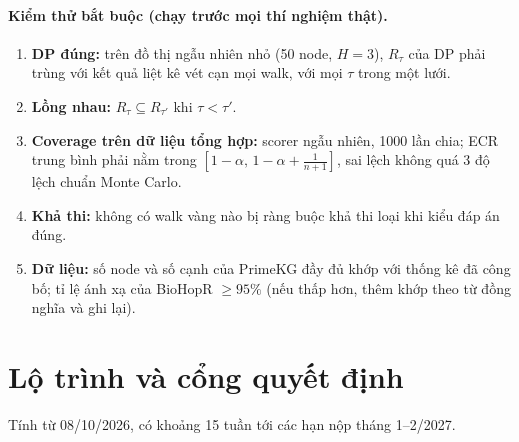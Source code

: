 \documentclass[11pt,a4paper]{article}
\theoremstyle{remark}
\begin{document}
\paragraph{Kiểm thử bắt buộc (chạy trước mọi thí nghiệm thật).}
\begin{enumerate}[nosep]
  \item \textbf{DP đúng:} trên đồ thị ngẫu nhiên nhỏ (50 node, $H=3$), $R_\tau$ của DP phải trùng với kết quả liệt kê vét cạn mọi walk, với mọi $\tau$ trong một lưới.
  \item \textbf{Lồng nhau:} $R_\tau\subseteq R_{\tau'}$ khi $\tau<\tau'$.
  \item \textbf{Coverage trên dữ liệu tổng hợp:} scorer ngẫu nhiên, 1000 lần chia; ECR trung bình phải nằm trong $[1-\alpha,\,1-\alpha+\tfrac1{n+1}]$, sai lệch không quá 3 độ lệch chuẩn Monte Carlo.
  \item \textbf{Khả thi:} không có walk vàng nào bị ràng buộc khả thi loại khi kiểu đáp án đúng.
  \item \textbf{Dữ liệu:} số node và số cạnh của PrimeKG đầy đủ khớp với thống kê đã công bố; tỉ lệ ánh xạ của BioHopR $\ge95\%$ (nếu thấp hơn, thêm khớp theo từ đồng nghĩa và ghi lại).
\end{enumerate}

\section{Lộ trình và cổng quyết định}\label{sec:plan}
Tính từ 08/10/2026, có khoảng 15 tuần tới các hạn nộp tháng 1--2/2027.
\end{document}

